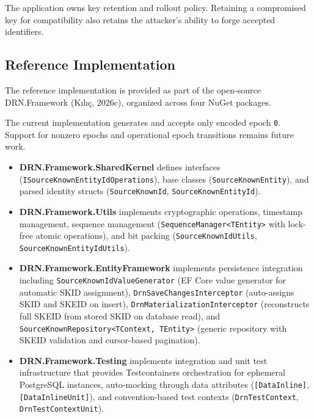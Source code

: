 \documentclass[fleqn,10pt]{wlpeerj}
\providecommand{\tightlist}{%
  \setlength{\itemsep}{0pt}\setlength{\parskip}{0pt}}
\begin{document}
The application owns key retention and rollout policy. Retaining a
compromised key for compatibility also retains the attacker's ability to
forge accepted identifiers.

\subsection{Reference Implementation}\label{reference-implementation}

The reference implementation is provided as part of the open-source
DRN.Framework (Kılıç, 2026c), organized across four NuGet packages.

The current implementation generates and accepts only encoded epoch
\texttt{0}. Support for nonzero epochs and operational epoch transitions
remains future work.

\begin{itemize}
\tightlist
\item
  \textbf{DRN.Framework.SharedKernel} defines interfaces
  (\texttt{ISourceKnownEntityIdOperations}), base classes
  (\texttt{SourceKnownEntity}), and parsed identity structs
  (\texttt{SourceKnownId}, \texttt{SourceKnownEntityId}).
\item
  \textbf{DRN.Framework.Utils} implements cryptographic operations,
  timestamp management, sequence management
  (\texttt{SequenceManager\textless{}TEntity\textgreater{}} with
  lock-free atomic operations), and bit packing
  (\texttt{SourceKnownIdUtils}, \texttt{SourceKnownEntityIdUtils}).
\item
  \textbf{DRN.Framework.EntityFramework} implements persistence
  integration including \texttt{SourceKnownIdValueGenerator} (EF Core
  value generator for automatic SKID assignment),
  \texttt{DrnSaveChangesInterceptor} (auto-assigns SKID and SKEID on
  insert), \texttt{DrnMaterializationInterceptor} (reconstructs full
  SKEID from stored SKID on database read), and
  \texttt{SourceKnownRepository\textless{}TContext,\ TEntity\textgreater{}}
  (generic repository with SKEID validation and cursor-based
  pagination).
\item
  \textbf{DRN.Framework.Testing} implements integration and unit test
  infrastructure that provides Testcontainers orchestration for
  ephemeral PostgreSQL instances, auto-mocking through data attributes
  (\texttt{{[}DataInline{]}}, \texttt{{[}DataInlineUnit{]}}), and
  convention-based test contexts (\texttt{DrnTestContext},
  \texttt{DrnTestContextUnit}).
\end{itemize}
\end{document}
